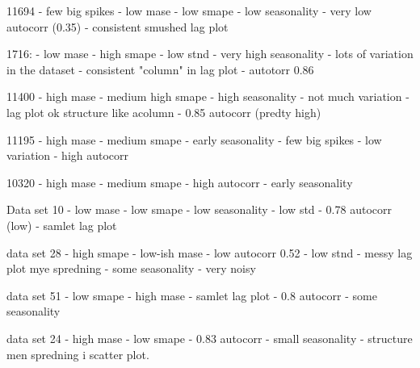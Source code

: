   11694
  - few big spikes
  - low mase
  - low smape
  - low seasonality
  - very low autocorr (0.35)
  - consistent smushed lag plot

  1716:
  - low mase
  - high smape
  - low stnd
  -  very high seasonality
  - lots of variation in the dataset
  - consistent "column" in lag plot
  - autotorr 0.86


  11400
  - high mase
  - medium high smape
  - high seasonality
  - not much variation
  - lag plot ok structure like acolumn
  - 0.85 autocorr (predty high)

  11195
  - high mase
  - medium smape
  - early seasonality
  - few big spikes
  - low variation
  - high autocorr

  10320
  - high mase
  - medium smape
  - high autocorr
  - early seasonality

  Data set 10
  - low mase
  - low smape
  - low seasonality
  - low std
  - 0.78 autocorr (low)
  - samlet lag plot

  data set 28
  - high smape
  - low-ish mase
  - low autocorr 0.52
  - low stnd
  - messy lag plot mye spredning
  - some seasonality
  - very noisy

  data set 51
  - low smape
  - high mase
  - samlet lag plot
  - 0.8 autocorr
  - some seasonality

  data set 24
  - high mase
  - low smape
  - 0.83 autocorr
  - small seasonality
  - structure men spredning i scatter plot.
\fi